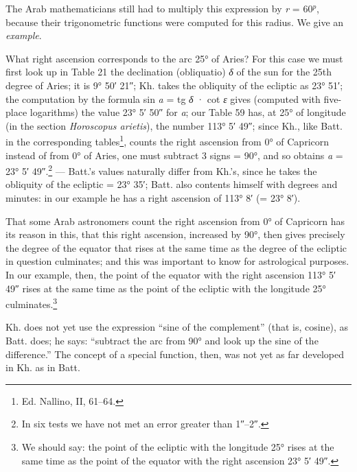 \documentclass[11pt]{article}
\newcommand{\Pg}[1]{\marginpar{\footnotesize\color{gray}#1}}
\begin{document}
\par The Arab mathematicians still had to multiply this expression by \emph{r} = 60$^{p}$, because their trigonometric functions were computed for this radius. We give an \emph{example}.\par
\par What right ascension corresponds to the arc 25° of Aries? For this case we must first look up in Table 21 the declination (obliquatio) \emph{{\greekfont δ}} of the sun for the 25th degree of Aries; it is 9° 50′ 21″; Kh. takes the obliquity of the ecliptic as 23° 51′; the computation by the formula sin \emph{a} = tg \emph{{\greekfont δ}} · cot \emph{{\greekfont ε}} gives (computed with five-place logarithms) the value 23° 5′ 50″ for \emph{a}; our Table 59 has, at 25° of longitude (in the section \emph{Horoscopus arietis}), the number 113° 5′ 49″; since Kh., like Batt. in the corresponding tables\footnote{Ed. Nallino, II, 61–64.}, counts the right ascension from 0° of Capricorn instead of from 0° of Aries, one must subtract 3 signs = 90°, and so obtains \emph{a} = 23° 5′ 49″.\footnote{In six tests we have not met an error greater than 1″–2″.} — Batt.'s values naturally differ from Kh.'s, since he takes the obliquity of the ecliptic = 23° 35′; Batt. also contents himself with degrees and minutes: in our example he has a right ascension of 113° 8′ (= 23° 8′).\par
\par \Pg{73}That some Arab astronomers count the right ascension from 0° of Capricorn has its reason in this, that this right ascension, increased by 90°, then gives precisely the degree of the equator that rises at the same time as the degree of the ecliptic in question culminates; and this was important to know for astrological purposes. In our example, then, the point of the equator with the right ascension 113° 5′ 49″ rises at the same time as the point of the ecliptic with the longitude 25° culminates.\footnote{We should say: the point of the ecliptic with the longitude 25° rises at the same time as the point of the equator with the right ascension 23° 5′ 49″.}\par
\par Kh. does not yet use the expression “sine of the complement” (that is, cosine), as Batt. does; he says: “subtract the arc from 90° and look up the sine of the difference.” The concept of a special function, then, was not yet as far developed in Kh. as in Batt.\par
\end{document}
